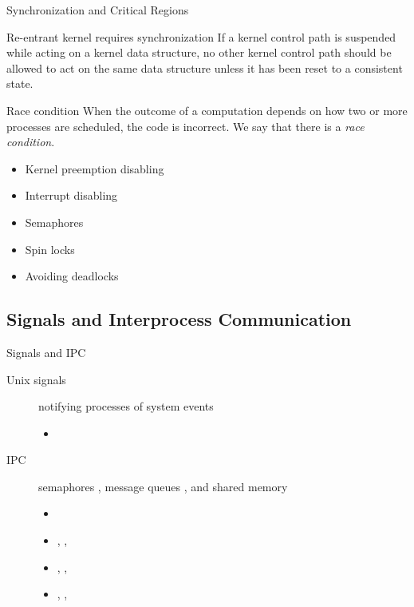 \begin{frame}{Synchronization and Critical Regions}
  \begin{exampleblock}{Re-entrant kernel requires synchronization}
    If a kernel control path is suspended while acting on a kernel data structure, no
    other kernel control path should be allowed to act on the same data structure unless
    it has been reset to a consistent state.
  \end{exampleblock}
  \begin{exampleblock}{Race condition}
    When the outcome of a computation depends on how two or more processes are scheduled,
    the code is incorrect. We say that there is a \emph{race condition}.
    \begin{itemize}
    \item Kernel preemption disabling
    \item Interrupt disabling
    \item Semaphores
    \item Spin locks
    \item Avoiding deadlocks
    \end{itemize}
  \end{exampleblock}
\end{frame}

\subsection{Signals and Interprocess Communication}
\label{sec:sign-interpr-comm}

\begin{frame}
  \begin{exampleblock}{Signals and IPC}
    \begin{description}
    \item[Unix signals] notifying processes of system events
      \begin{itemize}
      \item[] 
      \end{itemize}
    \item[IPC] semaphores , message queues , and shared memory
      \begin{itemize}
      \item[] 
      \item[] , , 
      \item[] , , 
      \item[] , ,
      \end{itemize}
    \end{description}
  \end{exampleblock}
\end{frame}

